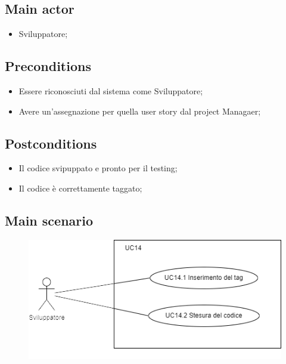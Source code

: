 \documentclass{article}
\begin{document}
    \subsection*{Main actor}
        \begin{itemize}
            \item Sviluppatore;
        \end{itemize}
    
    \subsection*{Preconditions}
        \begin{itemize}
            \item Essere riconosciuti dal sistema come Sviluppatore;
            \item Avere un'assegnazione per quella user story dal project Managaer;
        \end{itemize}
        
    \subsection*{Postconditions} 
        \begin{itemize}
            \item Il codice svipuppato e pronto per il testing;
            \item Il codice è correttamente taggato;  
        \end{itemize}
    
    \subsection*{Main scenario}
        \begin{figure}[h]
          \centering
          \includegraphics{./imgUML/UC14-zoom.png}
          \label{fig:immagine}
        \end{figure}
        
\end{document}
